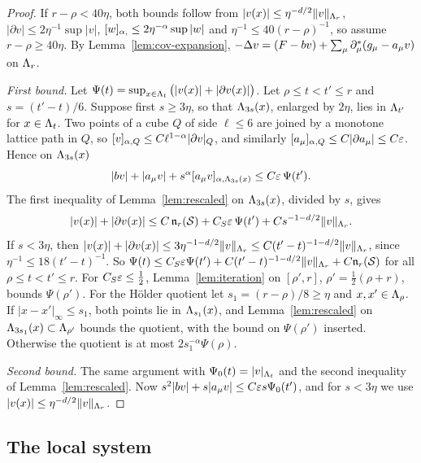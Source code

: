 \begin{proof}
If $r-\rho<40\eta$, both bounds follow from $|v(x)|\le\eta^{-d/2}\|v\|_{\Lambda_r}$, $|\partial v|\le2\eta^{-1}\sup|v|$, $[w]_{\alpha,}\le2\eta^{-\alpha}\sup|w|$ and $\eta^{-1}\le40(r-\rho)^{-1}$, so assume $r-\rho\ge40\eta$. By Lemma~\ref{lem:cov-expansion}, $-\Delta v=(F-bv)+\sum_\mu\partial^*_\mu(g_\mu-a_\mu v)$ on $\Lambda_r$.

\emph{First bound.} Let $\Psi(t)=\sup_{x\in\Lambda_t}\big(|v(x)|+|\partial v(x)|\big)$. Let $\rho\le t<t'\le r$ and $s=(t'-t)/6$. Suppose first $s\ge3\eta$, so that $\Lambda_{3s}(x)$, enlarged by $2\eta$, lies in $\Lambda_{t'}$ for $x\in\Lambda_t$. Two points of a cube $Q$ of side $\ell\le6$ are joined by a monotone lattice path in $Q$, so $[v]_{\alpha,Q}\le C\ell^{1-\alpha}|\partial v|_Q$, and similarly $[a_\mu]_{\alpha,Q}\le C|\partial a_\mu|\le C\varepsilon$. Hence on $\Lambda_{3s}(x)$
\[
|bv|+|a_\mu v|+s^\alpha[a_\mu v]_{\alpha,\Lambda_{3s}(x)}\le C\varepsilon\,\Psi(t').
\]
The first inequality of Lemma~\ref{lem:rescaled} on $\Lambda_{3s}(x)$, divided by $s$, gives
\[
|v(x)|+|\partial v(x)|\le C\,\mathfrak n_r(\mathcal S)+C_S\varepsilon\,\Psi(t')+Cs^{-1-d/2}\|v\|_{\Lambda_r}.
\]
If $s<3\eta$, then $|v(x)|+|\partial v(x)|\le3\eta^{-1-d/2}\|v\|_{\Lambda_r}\le C(t'-t)^{-1-d/2}\|v\|_{\Lambda_r}$, since $\eta^{-1}\le18(t'-t)^{-1}$. So $\Psi(t)\le C_S\varepsilon\Psi(t')+C(t'-t)^{-1-d/2}\|v\|_{\Lambda_r}+C\mathfrak n_r(\mathcal S)$ for all $\rho\le t<t'\le r$. For $C_S\varepsilon\le\frac12$, Lemma~\ref{lem:iteration} on $[\rho',r]$, $\rho'=\frac12(\rho+r)$, bounds $\Psi(\rho')$. For the H\"older quotient let $s_1=(r-\rho)/8\ge\eta$ and $x,x'\in\Lambda_\rho$. If $|x-x'|_\infty\le s_1$, both points lie in $\Lambda_{s_1}(x)$, and Lemma~\ref{lem:rescaled} on $\Lambda_{3s_1}(x)\subset\Lambda_{\rho'}$ bounds the quotient, with the bound on $\Psi(\rho')$ inserted. Otherwise the quotient is at most $2s_1^{-\alpha}\Psi(\rho)$.

\emph{Second bound.} The same argument with $\Psi_0(t)=|v|_{\Lambda_t}$ and the second inequality of Lemma~\ref{lem:rescaled}. Now $s^2|bv|+s|a_\mu v|\le C\varepsilon s\Psi_0(t')$, and for $s<3\eta$ we use $|v(x)|\le\eta^{-d/2}\|v\|_{\Lambda_r}$.
\end{proof}

\subsection{The local system}


